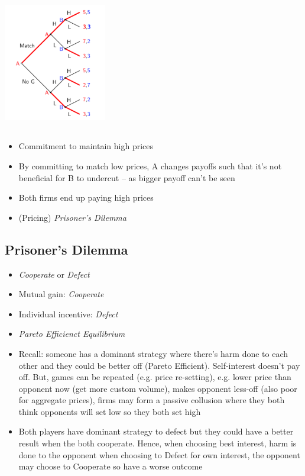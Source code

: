 \documentclass[11pt, english]{article}
\begin{document}
	\begin{center}
		\includegraphics[width=4.5cm,height=6cm]{EC315-IMG/5.png}
	\end{center}

	\begin{itemize}
	\setlength\itemsep{0cm}
		\item Commitment to maintain high prices
		\item By committing to match low prices, A changes payoffs such that it’s not beneficial for B to undercut – as bigger payoff can’t be seen 
		\item Both firms end up paying high prices
		\item (Pricing) \textit{Prisoner’s Dilemma}
	\end{itemize}

	\newpage

	\subsection{Prisoner's Dilemma}

	\begin{itemize}
	\setlength\itemsep{0cm}
		\item \textit{Cooperate} or \textit{Defect}
		\item Mutual gain: \textit{Cooperate}
		\item Individual incentive: \textit{Defect}
		\item \textit{Pareto Efficienct Equilibrium}
		\item Recall: someone has a dominant strategy where there’s harm done to each other and they could be better off (Pareto Efficient). Self-interest doesn’t pay off. But, games can be repeated (e.g. price re-setting), e.g. lower price than opponent now (get more custom volume), makes opponent less-off (also poor for aggregate prices), firms may form a passive collusion where they both think opponents will set low so they both set high
		\item Both players have dominant strategy to defect but they could have a better result when the both cooperate. Hence, when choosing best interest, harm is done to the opponent when choosing to Defect for own interest, the opponent may choose to Cooperate so have a worse outcome
	\end{itemize}
\end{document}
